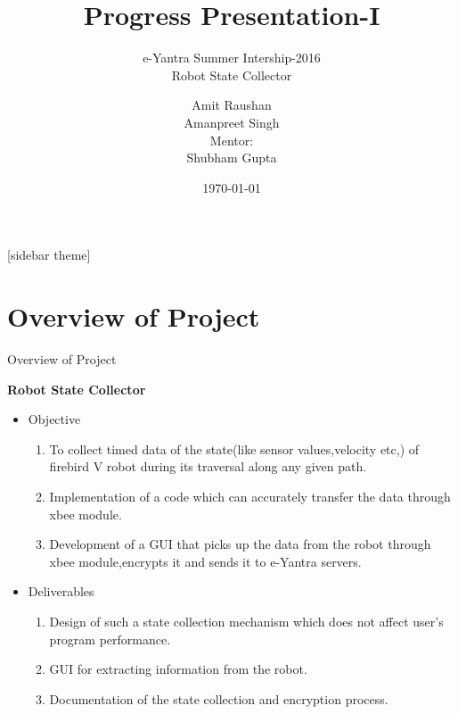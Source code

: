 \documentclass[10pt, a4paper]{beamer}
\begin{document}
	\title{Progress Presentation-I}
	\subtitle{e-Yantra Summer Intership-2016 \\ Robot State Collector}
	\author{Amit Raushan\\Amanpreet Singh\\
	 Mentor:\\ Shubham Gupta}
	\date{\today}
	\frame{\titlepage}

[sidebar theme]
\section{Overview of Project}
\begin{frame}{Overview of Project}
\begin{flushleft}
	{\Large \bf Robot State Collector}\\
	\begin{itemize}
		\item Objective
       \begin{enumerate}
                  \item  To collect timed data of  the state(like sensor values,velocity etc,) of firebird V robot during its traversal along any given path.
                      \item Implementation of a code which can accurately transfer the data through xbee module.
                          \item Development of a GUI that picks up the data from the robot through xbee module,encrypts it and sends it to e-Yantra servers.
\end{enumerate}
\item Deliverables
\begin{enumerate}
\item Design of such a state collection mechanism which does not affect user's program performance.
\item GUI for extracting information from the robot.
\item Documentation of the state collection and encryption process.
\end{enumerate}
\end{itemize}
\end{flushleft}
\end{frame}
\end{document}
